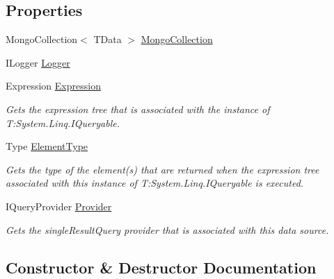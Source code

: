 \subsection*{Properties}
\begin{DoxyCompactItemize}
\item 
Mongo\+Collection$<$ T\+Data $>$ \hyperlink{classCqrs_1_1Mongo_1_1DataStores_1_1MongoDataStore_aa183a8ce44ec16d755f1e4fbe5ec4b10}{Mongo\+Collection}
\item 
I\+Logger \hyperlink{classCqrs_1_1Mongo_1_1DataStores_1_1MongoDataStore_a29e943482b60be2d3d253af59d3fc5eb}{Logger}
\item 
Expression \hyperlink{classCqrs_1_1Mongo_1_1DataStores_1_1MongoDataStore_a1a151694ae4eef805bd64aa7a3ae70ed}{Expression}
\begin{DoxyCompactList}\small\item\em Gets the expression tree that is associated with the instance of T\+:\+System.\+Linq.\+I\+Queryable. \end{DoxyCompactList}\item 
Type \hyperlink{classCqrs_1_1Mongo_1_1DataStores_1_1MongoDataStore_a0b55d9ca4d8ac206dd7beec30aa123df}{Element\+Type}
\begin{DoxyCompactList}\small\item\em Gets the type of the element(s) that are returned when the expression tree associated with this instance of T\+:\+System.\+Linq.\+I\+Queryable is executed. \end{DoxyCompactList}\item 
I\+Query\+Provider \hyperlink{classCqrs_1_1Mongo_1_1DataStores_1_1MongoDataStore_ae5de32a7a0da67a8aeaed9653db796ce}{Provider}
\begin{DoxyCompactList}\small\item\em Gets the single\+Result\+Query provider that is associated with this data source. \end{DoxyCompactList}\end{DoxyCompactItemize}


\subsection{Constructor \& Destructor Documentation}
\mbox{\label{classCqrs_1_1Mongo_1_1DataStores_1_1MongoDataStore_a39f738d53074a548e6932bacdc4a4e3a}} 
